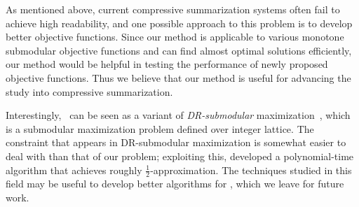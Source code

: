 \documentclass[11pt,a4paper]{article}
\begin{document}
	As mentioned above, 
	current 
	compressive summarization systems 
	often fail to achieve high readability, 
	and one possible approach to this problem is to develop better objective functions. 
	Since our method is applicable to various monotone submodular objective functions  
	and can find almost optimal solutions efficiently, our method would be helpful in 
	testing the performance of newly proposed objective functions. 
	Thus we believe that our method is useful for advancing the study into compressive summarization. 

	
	Interestingly, 
	\stkp\ can be seen as a variant of 
	{\it DR-submodular} maximization~\cite{soma2017non}, 
	which is a submodular maximization problem 
	defined over integer lattice. 
	The constraint that appears in DR-submodular maximization is 
	somewhat easier to deal with than that of our problem; 
	exploiting this, \citet{soma2017non} developed 
	a polynomial-time algorithm 
	that achieves roughly $\frac{1}{2}$-approximation. 
	The techniques studied in this field may be useful  
	to develop better algorithms for \stkp,  
	which we leave for future work. 
	
	
	
	
	
	
	
	
\end{document}
